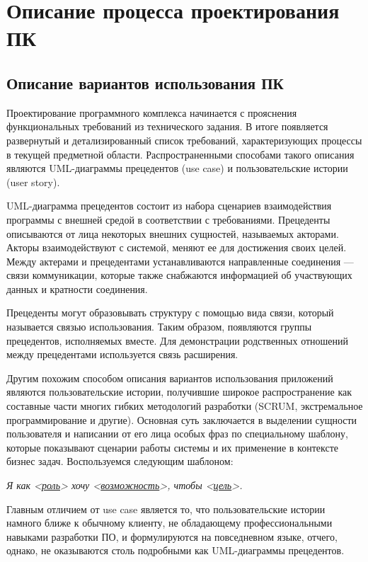 \section{Описание процесса проектирования ПК}



\subsection{Описание вариантов использования ПК}

Проектирование программного комплекса начинается с прояснения функциональных
требований из технического задания. В итоге появляется развернутый и
детализированный список требований, характеризующих процессы в текущей
предметной области.  Распространенными способами такого описания являются
UML-диаграммы прецедентов (use case) и пользовательские истории (user story).

UML-диаграмма прецедентов состоит из набора сценариев взаимодействия программы
с внешней средой в соответствии с требованиями. Прецеденты описываются от лица
некоторых внешних сущностей, называемых акторами. Акторы взаимодействуют с
системой, меняют ее для достижения своих целей. Между актерами и прецедентами
устанавливаются направленные соединения --- связи коммуникации, которые также
снабжаются информацией об участвующих данных и кратности соединения.

Прецеденты могут образовывать структуру с помощью вида связи, который
называется связью использования. Таким образом, появляются группы прецедентов,
исполняемых вместе. Для демонстрации родственных отношений между прецедентами
используется связь расширения.

Другим похожим способом описания вариантов использования приложений являются
пользовательские истории, получившие широкое распространение как составные
части многих гибких методологий разработки (SCRUM, экстремальное
программирование и другие). Основная суть заключается в выделении сущности
пользователя и написании от его лица особых фраз по специальному шаблону,
которые показывают сценарии работы системы и их применение в контексте бизнес
задач. Воспользуемся следующим шаблоном:

\hspace{2cm}\textit{
    Я как <\uline{роль}> хочу <\uline{возможность}>, чтобы
    <\uline{цель}>.
}


Главным отличием от use case является то, что пользовательские истории намного
ближе к обычному клиенту, не обладающему профессиональными навыками разработки
ПО, и формулируются на повседневном языке, отчего, однако, не оказываются столь
подробными как UML-диаграммы прецедентов.

